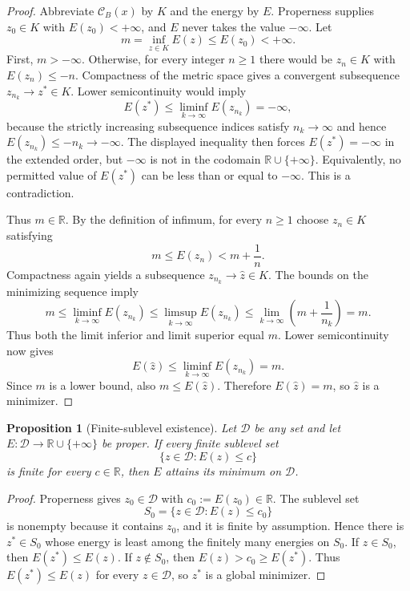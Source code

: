 \documentclass[11pt,oneside]{book}
\newtheorem{proposition}[definition]{Proposition}
\theoremstyle{remark}
\newcommand{\cB}{\mathcal C_B}
\begin{document}
\begin{proof}
Abbreviate $\cB(x)$ by $K$ and the energy by $E$. Properness supplies
$z_0\in K$ with $E(z_0)<+\infty$, and $E$ never takes the value $-\infty$.
Let
\[
m=\inf_{z\in K}E(z)\le E(z_0)<+\infty.
\]
First, $m>-\infty$. Otherwise, for every integer $n\ge1$ there would be
$z_n\in K$ with $E(z_n)\le-n$. Compactness of the metric space gives a
convergent subsequence $z_{n_k}\to z^*\in K$. Lower semicontinuity would imply
\[
E(z^*)\le\liminf_{k\to\infty}E(z_{n_k})=-\infty,
\]
because the strictly increasing subsequence indices satisfy
$n_k\to\infty$ and hence
$E(z_{n_k})\le-n_k\to-\infty$.
The displayed inequality then forces $E(z^*)=-\infty$ in the extended order,
but $-\infty$ is not in the codomain $\mathbb R\cup\{+\infty\}$. Equivalently,
no permitted value of $E(z^*)$ can be less than or equal to $-\infty$. This is
a contradiction.

Thus $m\in\mathbb R$. By the definition of infimum, for every $n\ge1$ choose
$z_n\in K$ satisfying
\[
m\le E(z_n)<m+\frac1n.
\]
Compactness again yields a subsequence $z_{n_k}\to\widehat z\in K$.
The bounds on the minimizing sequence imply
\[
m\le\liminf_{k\to\infty}E(z_{n_k})
\le\limsup_{k\to\infty}E(z_{n_k})
\le\lim_{k\to\infty}\left(m+\frac1{n_k}\right)=m.
\]
Thus both the limit inferior and limit superior equal $m$. Lower
semicontinuity now gives
\[
E(\widehat z)
\le\liminf_{k\to\infty}E(z_{n_k})
=m.
\]
Since $m$ is a lower bound, also $m\le E(\widehat z)$. Therefore
$E(\widehat z)=m$, so $\widehat z$ is a minimizer.
\end{proof}

\begin{proposition}[Finite-sublevel existence]
Let $\mathcal D$ be any set and let
$E:\mathcal D\to\mathbb R\cup\{+\infty\}$ be proper. If every finite
sublevel set
\[
\{z\in\mathcal D:E(z)\le c\}
\]
is finite for every $c\in\mathbb R$, then $E$ attains its minimum on
$\mathcal D$.
\end{proposition}

\begin{proof}
Properness gives $z_0\in\mathcal D$ with $c_0:=E(z_0)\in\mathbb R$. The
sublevel set
\[
S_0=\{z\in\mathcal D:E(z)\le c_0\}
\]
is nonempty because it contains $z_0$, and it is finite by assumption. Hence
there is $z^*\in S_0$ whose energy is least among the finitely many energies
on $S_0$. If $z\in S_0$, then $E(z^*)\le E(z)$. If
$z\notin S_0$, then $E(z)>c_0\ge E(z^*)$. Thus
$E(z^*)\le E(z)$ for every $z\in\mathcal D$, so $z^*$ is a global minimizer.
\end{proof}
\end{document}
